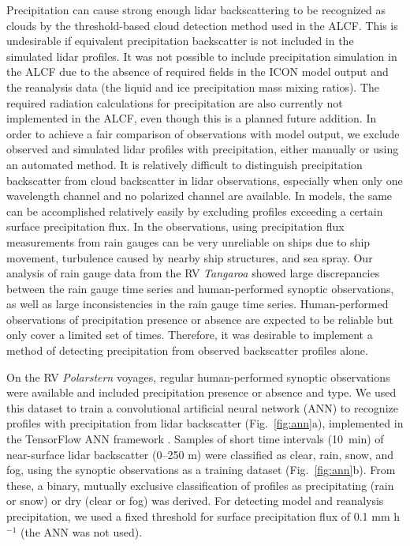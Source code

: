 \documentclass[draft]{agujournal2019}
\begin{document}
Precipitation can cause strong enough lidar backscattering to be recognized as clouds by the threshold-based cloud detection method used in the ALCF. This is undesirable if equivalent precipitation backscatter is not included in the simulated lidar profiles. It was not possible to include precipitation simulation in the ALCF due to the absence of required fields in the ICON model output and the reanalysis data (the liquid and ice precipitation mass mixing ratios). The required radiation calculations for precipitation are also currently not implemented in the ALCF, even though this is a planned future addition. In order to achieve a fair comparison of observations with model output, we exclude observed and simulated lidar profiles with precipitation, either manually or using an automated method. It is relatively difficult to distinguish precipitation backscatter from cloud backscatter in lidar observations, especially when only one wavelength channel and no polarized channel are available. In models, the same can be accomplished relatively easily by excluding profiles exceeding a certain surface precipitation flux. In the observations, using precipitation flux measurements from rain gauges can be very unreliable on ships due to ship movement, turbulence caused by nearby ship structures, and sea spray. Our analysis of rain gauge data from the RV \emph{Tangaroa} showed large discrepancies between the rain gauge time series and human-performed synoptic observations, as well as large inconsistencies in the rain gauge time series. Human-performed observations of precipitation presence or absence are expected to be reliable but only cover a limited set of times. Therefore, it was desirable to implement a method of detecting precipitation from observed backscatter profiles alone.

On the RV \emph{Polarstern} voyages, regular human-performed synoptic observations were available and included precipitation presence or absence and type. We used this dataset to train a convolutional artificial neural network (ANN) to recognize profiles with precipitation from lidar backscatter (Fig.~\ref{fig:ann}a), implemented in the TensorFlow ANN framework \cite{tensorflow}. Samples of short time intervals (10~min) of near-surface lidar backscatter (0–250 m) were classified as clear, rain, snow, and fog, using the synoptic observations as a training dataset (Fig.~\ref{fig:ann}b). From these, a binary, mutually exclusive classification of profiles as precipitating (rain or snow) or dry (clear or fog) was derived. For detecting model and reanalysis precipitation, we used a fixed threshold for surface precipitation flux of 0.1 mm h$^{-1}$ (the ANN was not used).
\end{document}
